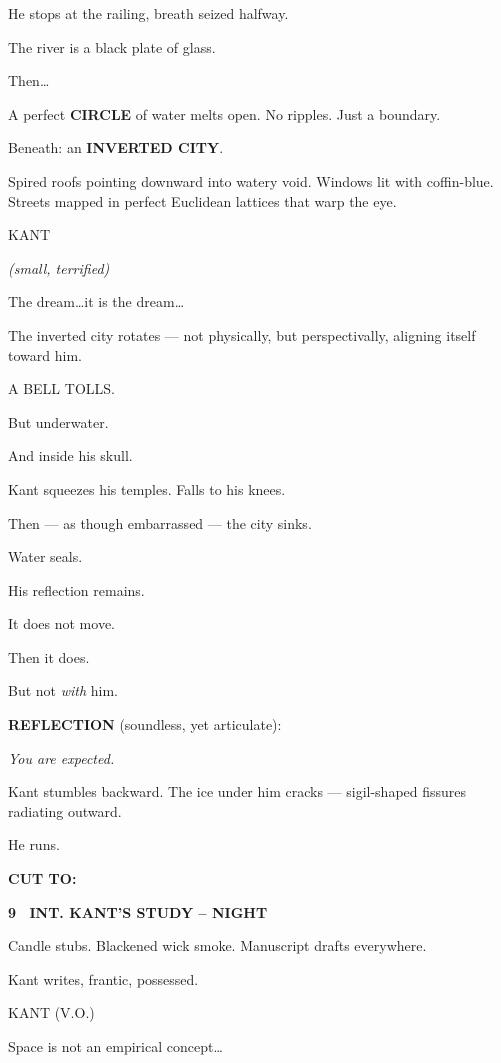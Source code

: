 \documentclass[12pt]{article}
\newcommand{\scene}[2]{%
  \vspace{1.8\baselineskip}%
  \noindent\textbf{#1 \ #2}\par\vspace{0.4\baselineskip}%
}
\newenvironment{dialogue}[1]{%
  \vspace{0.8\baselineskip}%
  \noindent\hspace*{2.3in}\textsc{#1}\par%
  \noindent\hspace*{1.5in}\begin{minipage}[t]{4.5in}%
}{%
  \end{minipage}\par%
}
\newcommand{\paren}[1]{%
  \noindent\hspace*{1.8in}\textit{(#1)}\par%
}
\newcommand{\transition}[1]{%
  \vspace{0.6\baselineskip}%
  \begin{flushright}\textbf{#1}\end{flushright}%
}
\begin{document}
He stops at the railing, breath seized halfway.

The river is a black plate of glass.

Then\ldots

A perfect \textbf{CIRCLE} of water melts open. No ripples. Just a boundary.

Beneath: an \textbf{INVERTED CITY}.

Spired roofs pointing downward into watery void. Windows lit with
coffin-blue. Streets mapped in perfect Euclidean lattices that warp the
eye.

\begin{dialogue}{KANT}
\paren{small, terrified}
The dream\ldots it is the dream\ldots
\end{dialogue}

The inverted city rotates --- not physically, but perspectivally,
aligning itself toward him.

A BELL TOLLS.

But underwater.

And inside his skull.

Kant squeezes his temples. Falls to his knees.

Then --- as though embarrassed --- the city sinks.

Water seals.

His reflection remains.

It does not move.

Then it does.

But not \emph{with} him.

\textbf{REFLECTION} (soundless, yet articulate):

\emph{You are expected.}

Kant stumbles backward. The ice under him cracks --- sigil-shaped
fissures radiating outward.

He runs.

\transition{CUT TO:}


\scene{9}{INT. KANT'S STUDY -- NIGHT}

Candle stubs. Blackened wick smoke. Manuscript drafts everywhere.

Kant writes, frantic, possessed.

\begin{dialogue}{KANT (V.O.)}
Space is not an empirical concept\ldots
\end{dialogue}
\end{document}
